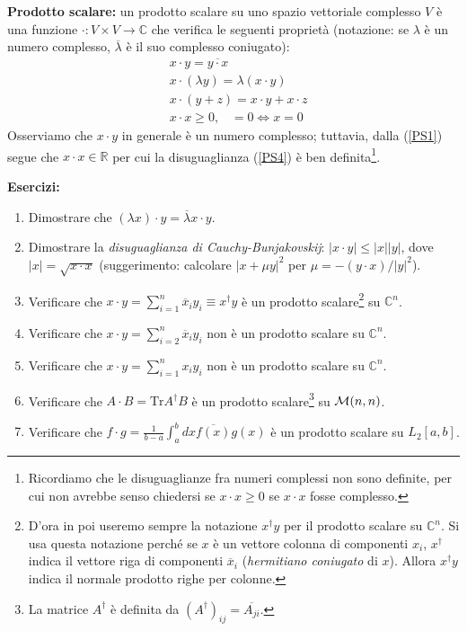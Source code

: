 \documentclass[a4paper,10pt]{article}
\newcommand{\linea}{\vskip14pt \noindent}
\begin{document}
\linea
{\bf Prodotto scalare:} un prodotto scalare su uno spazio vettoriale complesso $V$ \`e una
funzione $\cdot : V \times V \rightarrow \mathbb{C}$ che verifica le seguenti propriet\`a (notazione: se $\lambda$ \`e un numero complesso, $\overline{\lambda}$ \`e il suo complesso coniugato):
\begin{eqnarray}
\label{PS1}
&x \cdot y = \overline{y \cdot x} \\
\label{PS2}
&x \cdot (\lambda y) = \lambda (x\cdot y) \\
&x \cdot (y + z) = x \cdot y + x \cdot z \\
\label{PS4}
& x \cdot x \geq 0, \hspace{10pt} =0 \Leftrightarrow x=0
\end{eqnarray}
Osserviamo che $x \cdot y$ in generale \`e un numero complesso; tuttavia, dalla (\ref{PS1})
segue che $x\cdot x \in \mathbb{R}$ per cui la disuguaglianza (\ref{PS4}) \`e ben 
definita\footnote{Ricordiamo che le disuguaglianze fra numeri complessi non sono definite, per cui
non avrebbe senso chiedersi se $x\cdot x \geq 0$ se $x\cdot x$ fosse complesso.}.

\linea
{\bf Esercizi:}
\begin{enumerate}
\item Dimostrare che $(\lambda x) \cdot y = \overline{\lambda} x\cdot y$.
\item Dimostrare la {\it disuguaglianza di Cauchy-Bunjakovskij}: $|x\cdot y| \leq |x| |y|$, dove
$|x| = \sqrt{x\cdot x}$ (suggerimento: calcolare $|x + \mu y|^2$ per $\mu = - (y\cdot x) / |y|^2$).
\item Verificare che $x \cdot y = \sum_{i=1}^n \overline{x}_i y_i \equiv x^\dag y$ \`e un prodotto
scalare\footnote{D'ora in poi useremo sempre la notazione $x^\dag y$ per il prodotto scalare su
$\mathbb{C}^n$. Si usa questa notazione perch\'e se $x$ \`e un vettore colonna di componenti
$x_i$, $x^\dag$ indica il vettore riga di componenti $\overline{x}_i$ ({\it hermitiano coniugato}
di $x$). Allora $x^\dag y$ indica il normale prodotto righe per colonne.}
su $\mathbb{C}^n$.
\item Verificare che $x \cdot y = \sum_{i=2}^n \overline{x}_i y_i$ non \`e un prodotto
scalare su $\mathbb{C}^n$.
\item Verificare che $x \cdot y = \sum_{i=1}^n x_i y_i$ non \`e un prodotto
scalare su $\mathbb{C}^n$.
\item Verificare che $A \cdot B = \text{Tr} A^\dag B$ \`e un prodotto 
scalare\footnote{La matrice $A^\dag$ \`e definita da $(A^\dag)_{ij} = \overline{A_{ji}}$.}
su ${\cal M}(n,n)$.
\item Verificare che $f \cdot g = \frac{1}{b-a} \int_a^b dx \overline{f(x)} g(x)$ \`e un
prodotto scalare su $L_2[a,b]$.
\end{enumerate}
\end{document}
